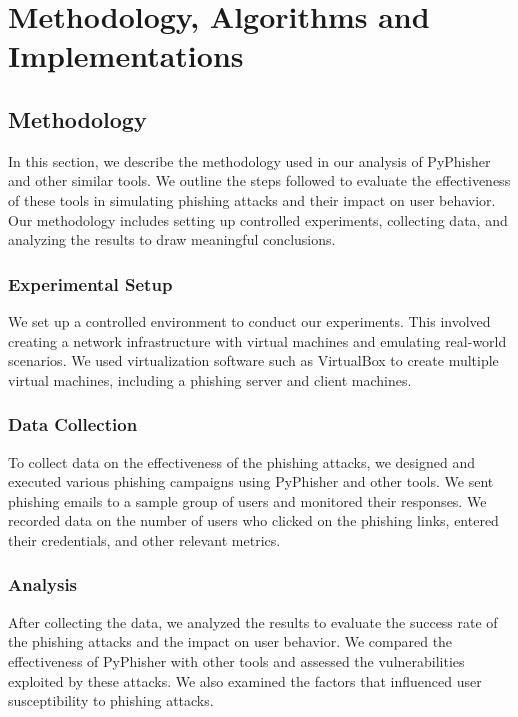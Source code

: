 \documentclass[openany]{report}
\begin{document}
\chapter{Methodology, Algorithms and Implementations}

\section{Methodology}

In this section, we describe the methodology used in our analysis of PyPhisher and other similar tools. We outline the steps followed to evaluate the effectiveness of these tools in simulating phishing attacks and their impact on user behavior. Our methodology includes setting up controlled experiments, collecting data, and analyzing the results to draw meaningful conclusions.

\subsection{Experimental Setup}

We set up a controlled environment to conduct our experiments. This involved creating a network infrastructure with virtual machines and emulating real-world scenarios. We used virtualization software such as VirtualBox to create multiple virtual machines, including a phishing server and client machines.

\subsection{Data Collection}

To collect data on the effectiveness of the phishing attacks, we designed and executed various phishing campaigns using PyPhisher and other tools. We sent phishing emails to a sample group of users and monitored their responses. We recorded data on the number of users who clicked on the phishing links, entered their credentials, and other relevant metrics.

\subsection{Analysis}

After collecting the data, we analyzed the results to evaluate the success rate of the phishing attacks and the impact on user behavior. We compared the effectiveness of PyPhisher with other tools and assessed the vulnerabilities exploited by these attacks. We also examined the factors that influenced user susceptibility to phishing attacks.
\end{document}
